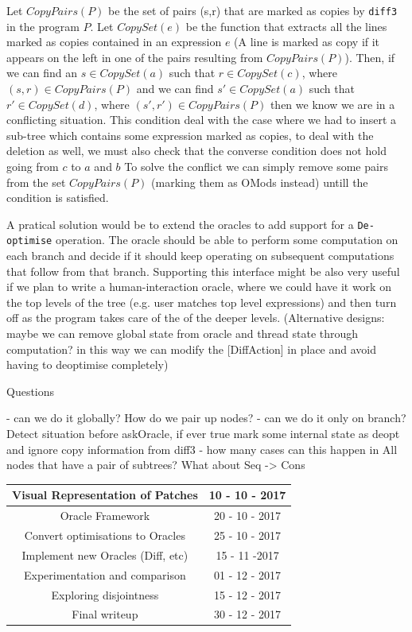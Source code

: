 \documentclass[11pt]{article}
\begin{document}
Let $CopyPairs(P)$ be the set of pairs (s,r) that are marked as copies by 
\texttt{diff3} in the program $P$.
Let $CopySet(e)$ be the function that extracts all the lines marked as copies 
contained in an expression $e$ (A line is marked as copy if it appears on the left in one of the pairs resulting from $CopyPairs(P)$).
Then, if we can find an $s \in CopySet(a)$ such that $r \in CopySet(c)$, where $(s,r) \in 
CopyPairs(P)$ and we can find $s' \in CopySet(a)$ such that $r' \in CopySet(d)$, where $(s',r') \in 
CopyPairs(P)$ then we know we are in a conflicting situation. 
This condition deal with the case where we had to insert a sub-tree which 
contains some expression marked as copies, to deal with the deletion as well, we 
must also check that the converse condition does not hold going from $c$ to $a$ 
and $b$
To solve the conflict we can simply remove some pairs from the set $CopyPairs(P)$ (marking them as OMods instead)
untill the condition is satisfied. 

A pratical solution would be to extend the oracles to add support for a \texttt{De-optimise} 
operation. The oracle should be able to perform some computation on each branch 
and decide if it should keep operating on subsequent computations that follow from that branch. 
Supporting this interface might be also very useful if we plan to write a human-interaction oracle, where we could have 
it work on the top levels of the tree (e.g. user matches top level expressions) 
and then turn off as the program takes care of the of the deeper levels. 
(Alternative designs: maybe we can remove global state from oracle and thread state through 
computation? in this way we can modify the [DiffAction] in place and avoid having to deoptimise completely)

Questions

 - can we do it globally?
         How do we pair up nodes?
 - can we do it only on branch?
         Detect situation before askOracle, if ever true mark some 
         internal state as deopt and ignore copy information from diff3
 - how many cases can this happen in
          All nodes that have a pair of subtrees? What about Seq -> Cons



\begin{center}
 \begin{tabular} { ||c|c|| }
   \hline Visual Representation of Patches & 10 - 10 - 2017 \\
   \hline
   \hline Oracle Framework & 20 - 10 - 2017 \\ 
   \hline Convert optimisations to Oracles & 25 - 10 - 2017 \\
   \hline Implement new Oracles (Diff, etc) & 15 - 11 -2017 \\ 
   \hline Experimentation and comparison & 01 - 12 - 2017 \\ 
   \hline
   \hline Exploring disjointness & 15 - 12 - 2017 \\
   \hline
   \hline Final writeup & 30 - 12 - 2017 \\
   \hline
 \end{tabular}
\end{center}
\end{document}
